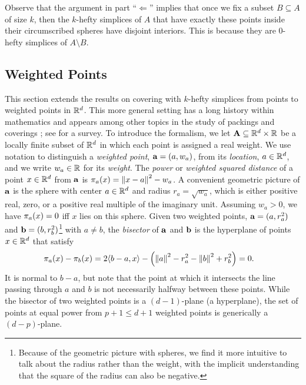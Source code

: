 \documentclass[10pt,a4paper]{article}
\newcommand {\mm}[1] {\ifmmode{#1}\else{\mbox{\(#1\)}}\fi}
\newcommand {\scalprod}[2] {{\langle #1 , #2 \rangle}}
\theoremstyle{plain}
\newcommand{\Rspace}        {\mm{{\mathbb R}}}
\newcommand{\AAA}           {\mm{\bf A}}
\newcommand{\aaa}           {\mm{\bf a}}
\newcommand{\bbb}           {\mm{\bf b}}
\newcommand{\wdist}[2]      {\mm{\pi_{#1}{({#2})}}}
\newcommand{\norm}[1]       {\mm{\|{#1}\|}}
\newcommand{\Edist}[2]      {\mm{\|{#1}-{#2}\|}}
\begin{document}
Observe that the argument in part ``$\Longleftarrow$'' implies that once we fix a subset $B \subseteq A$ of size $k$, then the $k$-hefty simplices of $A$ that have exactly these points inside their circumscribed spheres have disjoint interiors.
This is because they are $0$-hefty simplices of $A \setminus B$.
\subsection{Weighted Points}
\label{sec:2.5}
This section extends the results on covering with $k$-hefty simplices from points to weighted points in $\Rspace^d$.
This more general setting has a long history within mathematics and appears among other topics in the study of packings and coverings \cite{Rog64}; see \cite{Aur87} for a survey.
\smallskip
To introduce the formalism, we let $\AAA \subseteq \Rspace^d \times \Rspace$ be a locally finite subset of $\Rspace^d$ in which each point is assigned a real weight.
We use notation to distinguish a \emph{weighted point}, $\aaa = (a, w_a)$, from its \emph{location}, $a \in \Rspace^d$, and we write $w_a \in \Rspace$ for its \emph{weight}.
The \emph{power} or \emph{weighted squared distance} of a point $x \in \Rspace^d$ from $\aaa$ is $\wdist{a}{x} = \Edist{x}{a}^2 - w_a$.
A convenient geometric picture of $\aaa$ is the sphere with center $a \in \Rspace^d$ and radius $r_a = \sqrt{w_a}$, which is either positive real, zero, or a positive real multiple of the imaginary unit.
Assuming $w_a > 0$, we have $\wdist{a}{x} = 0$ iff $x$ lies on this sphere.
Given two weighted points, $\aaa = (a, r_a^2)$ and $\bbb = (b, r_b^2)$\footnote{Because of the geometric picture with spheres, we find it more intuitive to talk about the radius rather than the weight, with the implicit understanding that the square of the radius can also be negative.} with $a\neq b$, the \emph{bisector} of $\aaa$ and $\bbb$ is the hyperplane of points $x \in \Rspace^d$ that satisfy
\begin{align}
    \wdist{a}{x} - \wdist{b}{x}
    &=2 \scalprod{b-a}{x} - \left( \norm{a}^2 - r_a^2 - \norm{b}^2 + r_b^2 \right)
    = 0 .
\end{align}
It is normal to $b-a$, but note that the point at which it intersects the line passing through $a$ and $b$ is not necessarily halfway between these points.
While the bisector of two weighted points is a $(d-1)$-plane (a hyperplane), the set of points at equal power from $p+1 \leq d+1$ weighted points is generically a $(d-p)$-plane.
\end{document}
